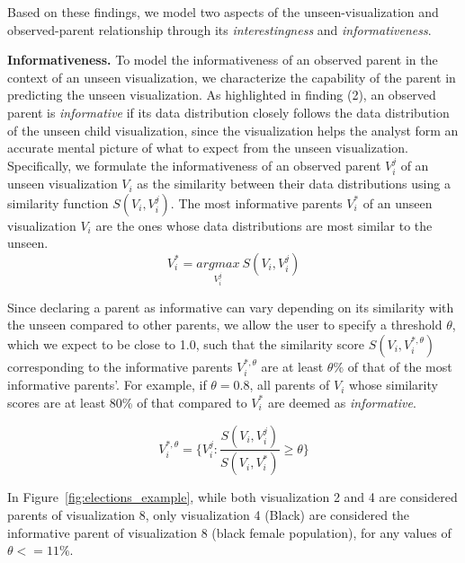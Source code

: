 Based on these findings, we model two aspects of the unseen-visualization and observed-parent relationship through its \textit{interestingness} and \textit{informativeness}. 

\textbf{Informativeness.} To model the informativeness of an observed parent in the context of an unseen visualization, we characterize the capability of the parent in predicting the unseen visualization. As highlighted in finding (2), an observed parent is \emph{informative} if its data distribution closely follows the data distribution of the unseen child visualization, since the visualization helps the analyst form an accurate mental picture of what to expect from the unseen visualization. Specifically, we formulate the informativeness of an observed parent $V_i^j$ of an unseen visualization $V_i$ as the similarity between their data distributions using a similarity function $S(V_i, V_i^j)$. The most informative parents $V_i^*$ of an unseen visualization $V_i$ are the ones whose data distributions are most similar to the unseen.
\begin{equation}
    V_i^*=\underset{V_i^j}{argmax}\ S(V_i, V_i^j)
\end{equation}

Since declaring a parent as informative can vary depending on its similarity with the unseen compared to other parents, we allow the user to specify a threshold $\theta$, which we expect to be close to 1.0, such that the similarity score $S(V_i, V_i^{*, \theta})$ corresponding to the informative parents $V_i^{*, \theta}$ are at least $\theta\%$ of that of the most informative parents'. For example, if $\theta = 0.8$, all parents of $V_i$ whose similarity scores are at least 80\% of that compared to $V_i^*$ are deemed as \textit{informative}.

\begin{equation}
    V_i^{*, \theta} = \{V_i^j : \frac{S(V_i, V_i^j)}{S(V_i, V_i^*)} \ge \theta\}
\end{equation}

In Figure~\ref{fig:elections_example}, while both visualization 2 and 4 are considered parents of visualization 8, only visualization 4 (Black) are considered the informative parent of visualization 8 (black female population), for any values of $\theta <= 11\%$. %

